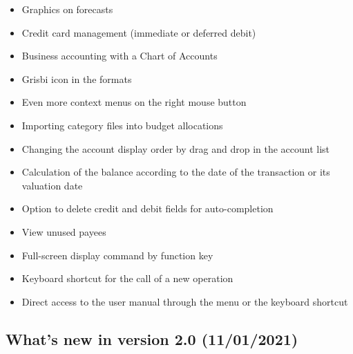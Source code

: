 \begin{itemize}%
	\item Graphics on forecasts
	\item Credit card management (immediate or deferred debit)
	\item Business accounting with a Chart of Accounts
	\item Grisbi icon in the  formats 
	\item Even more context menus on the right mouse button
	\item Importing category files into budget allocations
	\item Changing the account display order by drag and drop in the account list
	\item Calculation of the balance according to the date of the transaction or its valuation date
	\item Option to delete credit and debit fields for auto-completion
	\item View unused payees
	\item Full-screen display command by function key 
	\item Keyboard shortcut   for the call of a new operation
	\item Direct access to the user manual through the menu  or the keyboard shortcut  
\end{itemize}

\subsection{What's new in version 2.0 \textnormal{(11/01/2021)}}

